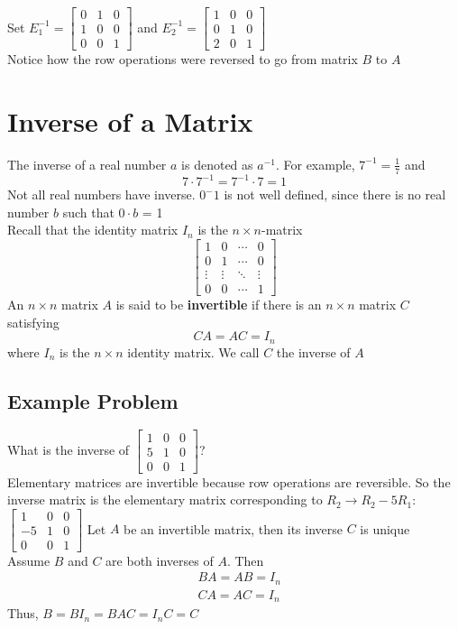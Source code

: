 Set $E_1^{-1} = \begin{bmatrix}
  0 & 1 & 0 \\
  1 & 0 & 0 \\
  0 & 0 & 1
  \end{bmatrix}$ and $E_2^{-1} = \begin{bmatrix}
  1 & 0 & 0 \\
  0 & 1 & 0 \\
  2 & 0 & 1
\end{bmatrix}$
\\[8pt]
Notice how the row operations were reversed to go from matrix $B$ to $A$

\section{Inverse of a Matrix}
The inverse of a real number $a$ is denoted as $a^{-1}$. For example, $7^{-1} = 
\frac{1}{7}$ and 
\[
  7 \cdot 7^{-1} = 7^{-1} \cdot 7 = 1
\]
Not all real numbers have inverse. $0^-1$ is not well defined, since there is no 
real number $b$ such that $0 \cdot b$ = 1 
\\[8pt]
Recall that the identity matrix $I_n$ is the $n \times n$-matrix 
\[
  \begin{bmatrix}
    1 & 0 & \cdots & 0 \\
    0 & 1 & \cdots & 0 \\
    \vdots & \vdots & \ddots & \vdots \\
    0 & 0 & \cdots & 1
  \end{bmatrix}
\]
An $n \times n$ matrix $A$ is said to be \textbf{invertible} if there is an 
$n \times n$ matrix $C$ satisfying 
\[
  CA = AC = I_n
\]
where $I_n$ is the $n \times n$ identity matrix. We call $C$ the inverse of $A$ 
\subsection{Example Problem}
What is the inverse of $\begin{bmatrix}
  1 & 0 & 0 \\
  5 & 1 & 0 \\
  0 & 0 & 1
\end{bmatrix}$?
\\[8pt]
Elementary matrices are invertible because row operations are reversible. So the 
inverse matrix is the elementary matrix corresponding to $R_2 \rightarrow R_2 - 
5R_1$: $\begin{bmatrix}
  1 & 0 & 0 \\
  -5 & 1 & 0 \\
  0 & 0 & 1
\end{bmatrix}$
Let $A$ be an invertible matrix, then its inverse $C$ is unique
\\[8pt]
Assume $B$ and $C$ are both inverses of $A$. Then 
\[
  \begin{aligned}
    &BA = AB = I_n \\
    &CA = AC = I_n
  \end{aligned}
\]
Thus, $B = BI_n = BAC = I_nC = C$

